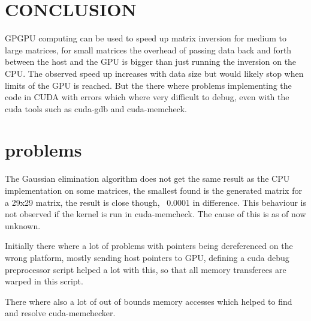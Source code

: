 
\section{CONCLUSION}
\label{sec:conclusion}

GPGPU computing can be used to speed up matrix inversion for medium to large matrices, for small matrices the overhead of passing data back and forth between the host and the GPU is bigger than just running the inversion on the CPU. The observed speed up increases with data size but would likely stop when limits of the GPU is reached. But the there where problems implementing the code in CUDA with errors which where very difficult to debug, even with the cuda tools such as cuda-gdb and cuda-memcheck.

\section{problems}
The Gaussian elimination algorithm does not get the same result as the CPU implementation on some matrices, the smallest found is the generated matrix for a 29x29 matrix, the result is close though, ~0.0001 in difference. This behaviour is not observed if the kernel is run in cuda-memcheck. The cause of this is as of now unknown. 

Initially there where a lot of problems with pointers being dereferenced on the wrong platform, mostly sending host pointers to GPU, defining a cuda debug preprocessor script helped a lot with this, so that all memory transferees are warped in this script. 

There where also a lot of out of bounds memory accesses which helped to find and resolve cuda-memchecker.
